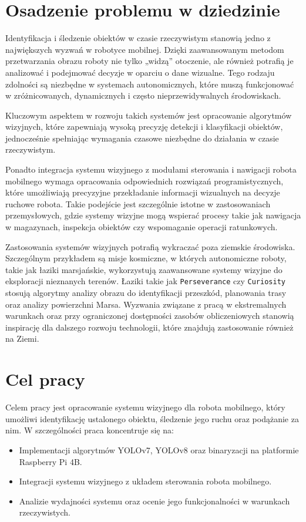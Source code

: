 \documentclass[a4paper,twoside,12pt]{book}
\begin{document}
\newpage
\section{Osadzenie problemu w dziedzinie}
Identyfikacja i śledzenie obiektów w czasie rzeczywistym stanowią jedno z największych wyzwań w robotyce mobilnej. Dzięki zaawansowanym metodom przetwarzania obrazu roboty nie tylko „widzą” otoczenie, ale również potrafią je analizować i podejmować decyzje w oparciu o dane wizualne. Tego rodzaju zdolności są niezbędne w systemach autonomicznych, które muszą funkcjonować w zróżnicowanych, dynamicznych i często nieprzewidywalnych środowiskach.

Kluczowym aspektem w rozwoju takich systemów jest opracowanie algorytmów wizyjnych, które zapewniają wysoką precyzję detekcji i klasyfikacji obiektów, jednocześnie spełniając wymagania czasowe niezbędne do działania w czasie rzeczywistym.

Ponadto integracja systemu wizyjnego z modułami sterowania i nawigacji robota mobilnego wymaga opracowania odpowiednich rozwiązań programistycznych, które umożliwiają precyzyjne przekładanie informacji wizualnych na decyzje ruchowe robota. Takie podejście jest szczególnie istotne w zastosowaniach przemysłowych, gdzie systemy wizyjne mogą wspierać procesy takie jak nawigacja w magazynach, inspekcja obiektów czy wspomaganie operacji ratunkowych.

Zastosowania systemów wizyjnych potrafią wykraczać poza ziemskie środowiska. Szczególnym przykładem są misje kosmiczne, w których autonomiczne roboty, takie jak łaziki marsjańskie, wykorzystują zaawansowane systemy wizyjne do eksploracji nieznanych terenów. Łaziki takie jak \texttt{Perseverance} czy \texttt{Curiosity} stosują algorytmy analizy obrazu do identyfikacji przeszkód, planowania trasy oraz analizy powierzchni Marsa. Wyzwania związane z pracą w ekstremalnych warunkach oraz przy ograniczonej dostępności zasobów obliczeniowych stanowią inspirację dla dalszego rozwoju technologii, które znajdują zastosowanie również na Ziemi.

\section{Cel pracy}
Celem pracy jest opracowanie systemu wizyjnego dla robota mobilnego, który umożliwi identyfikację ustalonego obiektu, śledzenie jego ruchu oraz podążanie za nim. W szczególności praca koncentruje się na:
\begin{itemize}
    \item Implementacji algorytmów YOLOv7, YOLOv8 oraz binaryzacji na platformie Raspberry Pi 4B.
    \item Integracji systemu wizyjnego z układem sterowania robota mobilnego.
    \item Analizie wydajności systemu oraz ocenie jego funkcjonalności w warunkach rzeczywistych.
\end{itemize}
\end{document}
